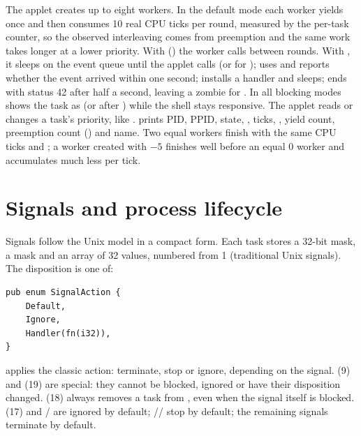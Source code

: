 The  applet
creates up to eight workers. In the default  mode each worker yields
once and then consumes 10 real CPU ticks per round, measured by the per-task
 counter, so the observed interleaving comes from preemption
and the same work takes longer at a lower priority. With 
() the worker calls  between
rounds. With , it sleeps on the event queue until the
 applet calls  (or  for
);  uses  and reports
whether the event arrived within one second;  installs a
 handler and sleeps;  ends with status 42 after half
a second, leaving a zombie for . In all blocking modes 
shows the task as  (or  after )
while the shell stays responsive. The  applet reads
or changes a task's priority, like .  prints PID,
PPID, state, ,  ticks, , yield count,
preemption count () and name. Two equal workers finish with the
same CPU ticks and ; a worker created with  $-5$
finishes well before an equal  $0$ worker and accumulates much
less  per tick.

\section{Signals and process lifecycle}

Signals follow the Unix model in a compact form. Each task stores a 32-bit
 mask, a  mask and an array of 32
 values, numbered from 1 (traditional Unix signals). The
disposition is one of:

\begin{lstlisting}[caption={Signal dispositions.},label={lst:signals}]
pub enum SignalAction {
    Default,
    Ignore,
    Handler(fn(i32)),
}
\end{lstlisting}

 applies the classic action: terminate, stop or ignore,
depending on the signal.  (9) and  (19) are
special: they cannot be blocked, ignored or have their disposition changed.
 (18) always removes a task from , even when the
signal itself is blocked.  (17) and /
are ignored by default; // stop by
default; the remaining signals terminate by default.

